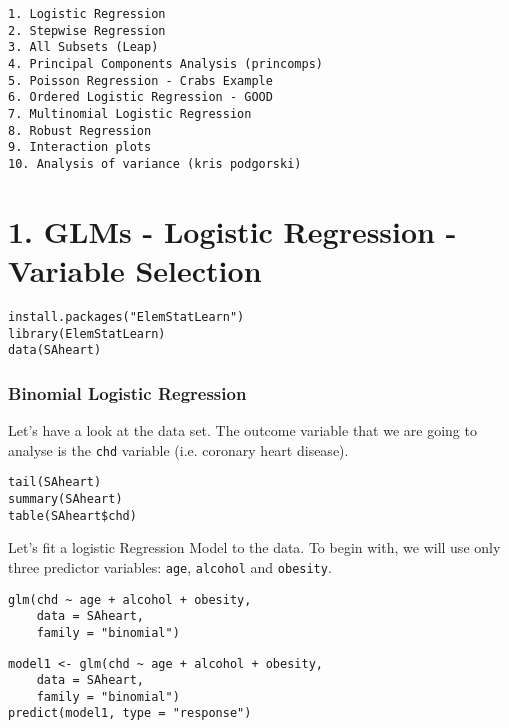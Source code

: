 \documentclass{beamer}
\begin{document}
\begin{frame}[fragile]
\begin{verbatim}
1. Logistic Regression
2. Stepwise Regression
3. All Subsets (Leap)
4. Principal Components Analysis (princomps)
5. Poisson Regression - Crabs Example
6. Ordered Logistic Regression - GOOD
7. Multinomial Logistic Regression
8. Robust Regression
9. Interaction plots
10. Analysis of variance (kris podgorski)
\end{verbatim}
\end{frame}
\section*{1. GLMs - Logistic Regression - Variable Selection}



\begin{frame}[fragile]
\begin{framed}
\begin{verbatim}
install.packages("ElemStatLearn")
library(ElemStatLearn)
data(SAheart)
\end{verbatim}
\end{framed}

\end{frame}
\begin{frame}[fragile]
\frametitle{Binomial Logistic Regression}
Let's have a look at the data set. 
The outcome variable that we are going to analyse is the \texttt{chd} variable (i.e. coronary heart disease).
\begin{framed}
\begin{verbatim}
tail(SAheart)
summary(SAheart)
table(SAheart$chd)
\end{verbatim}
\end{framed}
\end{frame}
\begin{frame}[fragile]
Let's fit a logistic Regression Model to the data. 
To begin with, we will use only three predictor variables: \texttt{age}, \texttt{alcohol} and \texttt{obesity}.

\begin{framed}
\begin{verbatim}
glm(chd ~ age + alcohol + obesity, 
    data = SAheart, 
    family = "binomial")
\end{verbatim}
\end{framed}

\end{frame}
\begin{frame}[fragile]

\begin{framed}
\begin{verbatim}
model1 <- glm(chd ~ age + alcohol + obesity, 
    data = SAheart, 
    family = "binomial")
predict(model1, type = "response")    
\end{verbatim}
\end{framed}

\end{frame}
\end{document}
